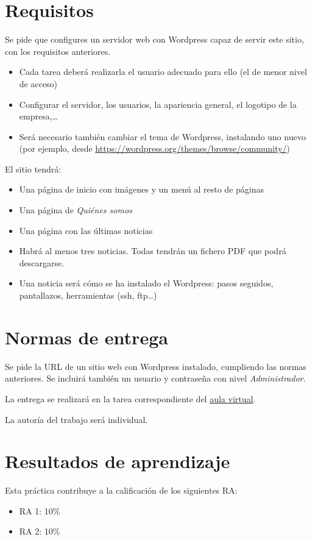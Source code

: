 \documentclass[a4paper]{article}
\begin{document}
\section{Requisitos}
\label{sec:org0000009}
Se pide que configures un servidor web con Wordpress capaz de servir este sitio, con los requisitos anteriores.
\begin{itemize}
\item Cada tarea deberá realizarla el usuario adecuado para ello (el de menor nivel de acceso)
\item Configurar el servidor, los usuarios, la apariencia general, el logotipo de la empresa,\ldots{}
\item Será necesario también cambiar el tema de Wordpress, instalando uno nuevo (por ejemplo, desde \url{https://wordpress.org/themes/browse/community/})
\end{itemize}

El sitio tendrá:
\begin{itemize}
\item Una página de inicio con imágenes y un menú al resto de páginas
\item Una página de \emph{Quiénes somos}
\item Una página con las últimas noticias
\item Habrá al menos tres noticias. Todas tendrán un fichero PDF que podrá descargarse.
\item Una noticia será cómo se ha instalado el Wordpress: pasos seguidos, pantallazos, herramientas (ssh, ftp\ldots{})
\end{itemize}
\section{Normas de entrega}
\label{sec:org000000c}
Se pide la URL de un sitio web con Wordpress instalado, cumpliendo las normas anteriores. Se incluirá también un usuario y contraseña con nivel \emph{Administrador}.

La entrega se realizará en la tarea correspondiente del \href{https://aulavirtual3.educa.madrid.org/ies.alonsodeavellan.alcala/}{aula virtual}.

La autoría del trabajo será individual.
\section{Resultados de aprendizaje}
\label{sec:org000000f}
Esta práctica contribuye a la calificación de los siguientes RA:
\begin{itemize}
\item RA 1: 10\%
\item RA 2: 10\%
\end{itemize}
\end{document}
